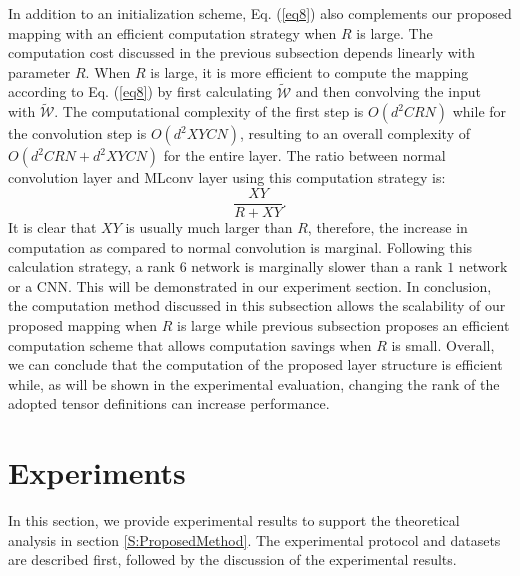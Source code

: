 \documentclass[conference,usletter]{IEEEtran}
\begin{document}
In addition to an initialization scheme, Eq. (\ref{eq8}) also complements our proposed mapping with an efficient computation strategy when $R$ is large. The computation cost discussed in the previous subsection depends linearly with parameter $R$. When $R$ is large, it is more efficient to compute the mapping according to Eq. (\ref{eq8}) by first calculating $\tilde{\mathcal{W}}$ and then convolving the input with $\tilde{\mathcal{W}}$. The computational complexity of the first step is $O(d^2CRN)$ while for the convolution step is $O(d^2XYCN)$, resulting to an overall complexity of $O(d^2CRN+d^2XYCN)$ for the entire layer. The ratio between normal convolution layer and MLconv layer using this computation strategy is:
\begin{equation}\label{eq9}
\frac{XY}{R+XY}.
\end{equation}
It is clear that $XY$ is usually much larger than $R$, therefore, the increase in computation as compared to normal convolution is marginal. Following this calculation strategy, a rank $6$ network is marginally slower than a rank $1$ network or a CNN. This will be demonstrated in our experiment section. In conclusion, the computation method discussed in this subsection allows the scalability of our proposed mapping when $R$ is large while previous subsection proposes an efficient computation scheme that allows computation savings when $R$ is small. Overall, we can conclude that the computation of the proposed layer structure is efficient while, as will be shown in the experimental evaluation, changing the rank of the adopted tensor definitions can increase performance.



\section{Experiments}
In this section, we provide experimental results to support the theoretical analysis in section \ref{S:ProposedMethod}. The experimental protocol and datasets are described first, followed by the discussion of the experimental results.
\end{document}
